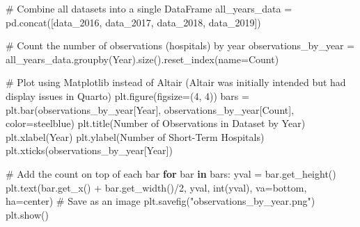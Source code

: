 \documentclass[
  letterpaper,
  DIV=11,
  numbers=noendperiod]{scrartcl}
\newenvironment{Shaded}{\begin{snugshade}}{\end{snugshade}}
\newcommand{\BuiltInTok}[1]{\textcolor[rgb]{0.00,0.23,0.31}{#1}}
\newcommand{\CommentTok}[1]{\textcolor[rgb]{0.37,0.37,0.37}{#1}}
\newcommand{\ControlFlowTok}[1]{\textcolor[rgb]{0.00,0.23,0.31}{\textbf{#1}}}
\newcommand{\DecValTok}[1]{\textcolor[rgb]{0.68,0.00,0.00}{#1}}
\newcommand{\KeywordTok}[1]{\textcolor[rgb]{0.00,0.23,0.31}{\textbf{#1}}}
\newcommand{\NormalTok}[1]{\textcolor[rgb]{0.00,0.23,0.31}{#1}}
\newcommand{\OperatorTok}[1]{\textcolor[rgb]{0.37,0.37,0.37}{#1}}
\newcommand{\StringTok}[1]{\textcolor[rgb]{0.13,0.47,0.30}{#1}}
\begin{document}
\begin{Shaded}
\begin{Highlighting}[]
\CommentTok{\# Combine all datasets into a single DataFrame}
\NormalTok{all\_years\_data }\OperatorTok{=}\NormalTok{ pd.concat([data\_2016, data\_2017, data\_2018, data\_2019])}

\CommentTok{\# Count the number of observations (hospitals) by year}
\NormalTok{observations\_by\_year }\OperatorTok{=}\NormalTok{ all\_years\_data.groupby(}\StringTok{\textquotesingle{}Year\textquotesingle{}}\NormalTok{).size().reset\_index(name}\OperatorTok{=}\StringTok{\textquotesingle{}Count\textquotesingle{}}\NormalTok{)}

\CommentTok{\# Plot using Matplotlib instead of Altair (Altair was initially intended but had display issues in Quarto)}
\NormalTok{plt.figure(figsize}\OperatorTok{=}\NormalTok{(}\DecValTok{4}\NormalTok{, }\DecValTok{4}\NormalTok{))}
\NormalTok{bars }\OperatorTok{=}\NormalTok{ plt.bar(observations\_by\_year[}\StringTok{\textquotesingle{}Year\textquotesingle{}}\NormalTok{], observations\_by\_year[}\StringTok{\textquotesingle{}Count\textquotesingle{}}\NormalTok{], color}\OperatorTok{=}\StringTok{\textquotesingle{}steelblue\textquotesingle{}}\NormalTok{)}
\NormalTok{plt.title(}\StringTok{\textquotesingle{}Number of Observations in Dataset by Year\textquotesingle{}}\NormalTok{)}
\NormalTok{plt.xlabel(}\StringTok{\textquotesingle{}Year\textquotesingle{}}\NormalTok{)}
\NormalTok{plt.ylabel(}\StringTok{\textquotesingle{}Number of Short{-}Term Hospitals\textquotesingle{}}\NormalTok{)}
\NormalTok{plt.xticks(observations\_by\_year[}\StringTok{\textquotesingle{}Year\textquotesingle{}}\NormalTok{])}

\CommentTok{\# Add the count on top of each bar}
\ControlFlowTok{for}\NormalTok{ bar }\KeywordTok{in}\NormalTok{ bars:}
\NormalTok{    yval }\OperatorTok{=}\NormalTok{ bar.get\_height()}
\NormalTok{    plt.text(bar.get\_x() }\OperatorTok{+}\NormalTok{ bar.get\_width()}\OperatorTok{/}\DecValTok{2}\NormalTok{, yval, }\BuiltInTok{int}\NormalTok{(yval), va}\OperatorTok{=}\StringTok{\textquotesingle{}bottom\textquotesingle{}}\NormalTok{, ha}\OperatorTok{=}\StringTok{\textquotesingle{}center\textquotesingle{}}\NormalTok{)}
\CommentTok{\# Save as an image}
\NormalTok{plt.savefig(}\StringTok{"observations\_by\_year.png"}\NormalTok{)}
\NormalTok{plt.show()}
\end{Highlighting}
\end{Shaded}
\end{document}
